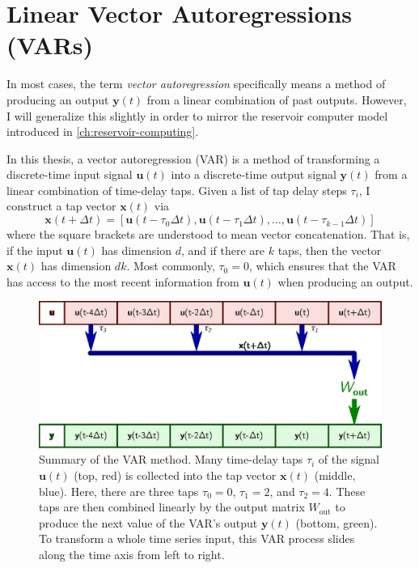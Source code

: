 \section{Linear Vector Autoregressions (VARs)}

In most cases, the term \emph{vector autoregression} specifically
means a method of producing an output $\bm{y}(t)$ from a linear
combination of past outputs. However, I will generalize this slightly
in order to mirror the reservoir computer model introduced in
\cref{ch:reservoir-computing}.

In this thesis, a vector autoregression (VAR) is a method of
transforming a discrete-time input signal $\bm{u}(t)$ into a
discrete-time output signal $\bm{y}(t)$ from a linear combination of
time-delay taps. Given a list of tap delay steps $\tau_i$, I construct
a tap vector $\bm{x}(t)$ via
\begin{equation}
  \label{eq:var-x}
  \bm{x}(t + \Delta t) = [\bm{u}(t - \tau_0 \Delta t), \bm{u}(t - \tau_1 \Delta t), \dots, \bm{u}(t - \tau_{k-1} \Delta t)]
\end{equation}
where the square brackets are understood to mean vector
concatenation. That is, if the input $\bm{u}(t)$ has dimension $d$,
and if there are $k$ taps, then the vector $\bm{x}(t)$ has dimension
$dk$. Most commonly, $\tau_0 = 0$, which ensures that the VAR has access to the most recent information from $\bm{u}(t)$ when producing an output.

\begin{figure}
  \includegraphics{figures/var-infer}
  \caption{Summary of the VAR method. Many time-delay taps $\tau_i$ of
    the signal $\bm{u}(t)$ (top, red) is collected into the tap vector
    $\bm{x}(t)$ (middle, blue). Here, there are three taps $\tau_0=0$,
    $\tau_1=2$, and $\tau_2=4$. These taps are then combined linearly
    by the output matrix $W_\text{out}$ to produce the next value of
    the VAR's output $\bm{y}(t)$ (bottom, green). To transform a whole
    time series input, this VAR process slides along the time axis
    from left to right.}
  \label{fig:var-infer}
\end{figure}

